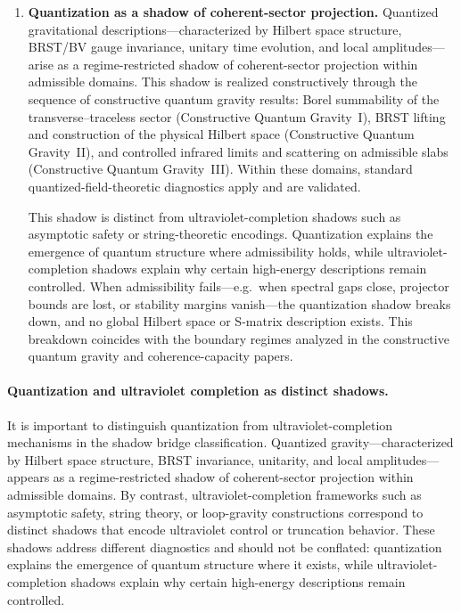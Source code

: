 \documentclass[11pt]{article}
\begin{document}
\begin{enumerate}[label=\textbf{B\arabic*}]
\item \textbf{Quantization as a shadow of coherent-sector projection.}
Quantized gravitational descriptions—characterized by Hilbert space structure, BRST/BV
gauge invariance, unitary time evolution, and local amplitudes—arise as a regime-restricted
shadow of coherent-sector projection within admissible domains. This shadow is realized
constructively through the sequence of constructive quantum gravity results: Borel
summability of the transverse–traceless sector (Constructive Quantum Gravity~I), BRST
lifting and construction of the physical Hilbert space (Constructive Quantum Gravity~II),
and controlled infrared limits and scattering on admissible slabs (Constructive Quantum
Gravity~III). Within these domains, standard quantized-field-theoretic diagnostics apply
and are validated.

This shadow is distinct from ultraviolet-completion shadows such as asymptotic safety or
string-theoretic encodings. Quantization explains the emergence of quantum structure
where admissibility holds, while ultraviolet-completion shadows explain why certain
high-energy descriptions remain controlled. When admissibility fails—e.g.\ when spectral
gaps close, projector bounds are lost, or stability margins vanish—the quantization shadow
breaks down, and no global Hilbert space or S-matrix description exists. This breakdown
coincides with the boundary regimes analyzed in the constructive quantum gravity and
coherence-capacity papers.

\end{enumerate}

\paragraph{Quantization and ultraviolet completion as distinct shadows.}
It is important to distinguish quantization from ultraviolet-completion mechanisms in the shadow
bridge classification. Quantized gravity—characterized by Hilbert space structure, BRST
invariance, unitarity, and local amplitudes—appears as a regime-restricted shadow of coherent-sector
projection within admissible domains. By contrast, ultraviolet-completion frameworks such as
asymptotic safety, string theory, or loop-gravity constructions correspond to distinct shadows that
encode ultraviolet control or truncation behavior. These shadows address different diagnostics and
should not be conflated: quantization explains the emergence of quantum structure where it exists,
while ultraviolet-completion shadows explain why certain high-energy descriptions remain
controlled.
\end{document}
